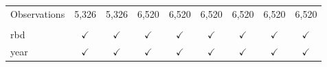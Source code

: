 \begin{table}[htbp]
\begin{tabular}{lcccccccc}
       \\
      Observations                          & 5,326         & 5,326         & 6,520         & 6,520         & 6,520          & 6,520         & 6,520         & 6,520\\  
       \\
      rbd                                   & $\checkmark$  & $\checkmark$  & $\checkmark$  & $\checkmark$  & $\checkmark$   & $\checkmark$  & $\checkmark$  & $\checkmark$\\   
      year                                  & $\checkmark$  & $\checkmark$  & $\checkmark$  & $\checkmark$  & $\checkmark$   & $\checkmark$  & $\checkmark$  & $\checkmark$\\   
      \bottomrule
   \end{tabular}
\end{table}
